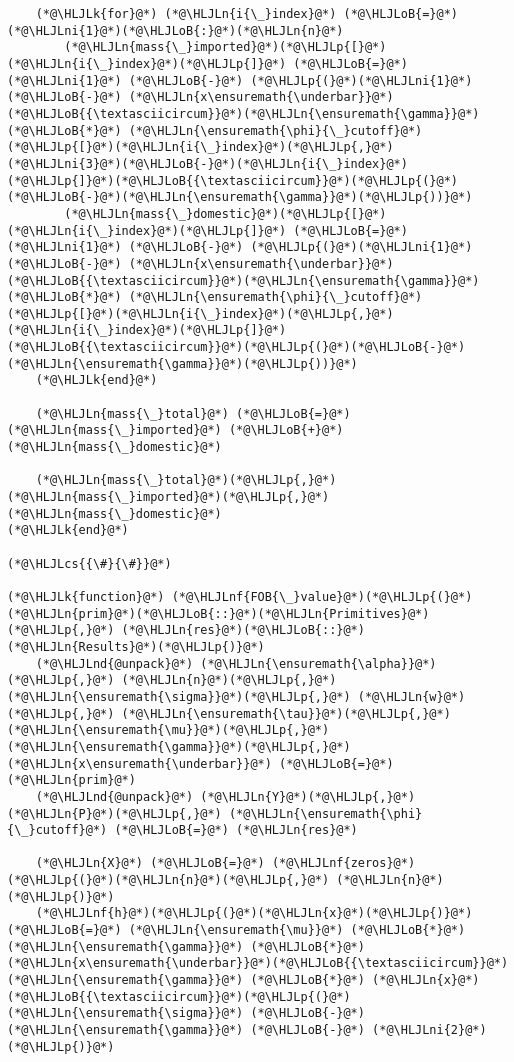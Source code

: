 \documentclass[12pt,a4paper]{article}
\newcommand{\HLJLk}[1]{\textcolor[RGB]{148,91,176}{\textbf{#1}}}
\newcommand{\HLJLn}[1]{#1}
\newcommand{\HLJLnd}[1]{\textcolor[RGB]{214,102,97}{#1}}
\newcommand{\HLJLnf}[1]{\textcolor[RGB]{66,102,213}{#1}}
\newcommand{\HLJLni}[1]{\textcolor[RGB]{59,151,46}{#1}}
\newcommand{\HLJLoB}[1]{\textcolor[RGB]{102,102,102}{\textbf{#1}}}
\newcommand{\HLJLp}[1]{#1}
\newcommand{\HLJLcs}[1]{\textcolor[RGB]{153,153,119}{\textit{#1}}}
\begin{document}
\begin{lstlisting}
    (*@\HLJLk{for}@*) (*@\HLJLn{i{\_}index}@*) (*@\HLJLoB{=}@*) (*@\HLJLni{1}@*)(*@\HLJLoB{:}@*)(*@\HLJLn{n}@*)
        (*@\HLJLn{mass{\_}imported}@*)(*@\HLJLp{[}@*)(*@\HLJLn{i{\_}index}@*)(*@\HLJLp{]}@*) (*@\HLJLoB{=}@*) (*@\HLJLni{1}@*) (*@\HLJLoB{-}@*) (*@\HLJLp{(}@*)(*@\HLJLni{1}@*) (*@\HLJLoB{-}@*) (*@\HLJLn{x\ensuremath{\underbar}}@*)(*@\HLJLoB{{\textasciicircum}}@*)(*@\HLJLn{\ensuremath{\gamma}}@*) (*@\HLJLoB{*}@*) (*@\HLJLn{\ensuremath{\phi}{\_}cutoff}@*)(*@\HLJLp{[}@*)(*@\HLJLn{i{\_}index}@*)(*@\HLJLp{,}@*) (*@\HLJLni{3}@*)(*@\HLJLoB{-}@*)(*@\HLJLn{i{\_}index}@*)(*@\HLJLp{]}@*)(*@\HLJLoB{{\textasciicircum}}@*)(*@\HLJLp{(}@*)(*@\HLJLoB{-}@*)(*@\HLJLn{\ensuremath{\gamma}}@*)(*@\HLJLp{))}@*)
        (*@\HLJLn{mass{\_}domestic}@*)(*@\HLJLp{[}@*)(*@\HLJLn{i{\_}index}@*)(*@\HLJLp{]}@*) (*@\HLJLoB{=}@*) (*@\HLJLni{1}@*) (*@\HLJLoB{-}@*) (*@\HLJLp{(}@*)(*@\HLJLni{1}@*) (*@\HLJLoB{-}@*) (*@\HLJLn{x\ensuremath{\underbar}}@*)(*@\HLJLoB{{\textasciicircum}}@*)(*@\HLJLn{\ensuremath{\gamma}}@*) (*@\HLJLoB{*}@*) (*@\HLJLn{\ensuremath{\phi}{\_}cutoff}@*)(*@\HLJLp{[}@*)(*@\HLJLn{i{\_}index}@*)(*@\HLJLp{,}@*) (*@\HLJLn{i{\_}index}@*)(*@\HLJLp{]}@*)(*@\HLJLoB{{\textasciicircum}}@*)(*@\HLJLp{(}@*)(*@\HLJLoB{-}@*)(*@\HLJLn{\ensuremath{\gamma}}@*)(*@\HLJLp{))}@*)
    (*@\HLJLk{end}@*)

    (*@\HLJLn{mass{\_}total}@*) (*@\HLJLoB{=}@*) (*@\HLJLn{mass{\_}imported}@*) (*@\HLJLoB{+}@*) (*@\HLJLn{mass{\_}domestic}@*)

    (*@\HLJLn{mass{\_}total}@*)(*@\HLJLp{,}@*) (*@\HLJLn{mass{\_}imported}@*)(*@\HLJLp{,}@*) (*@\HLJLn{mass{\_}domestic}@*)
(*@\HLJLk{end}@*)

(*@\HLJLcs{{\#}{\#}}@*)

(*@\HLJLk{function}@*) (*@\HLJLnf{FOB{\_}value}@*)(*@\HLJLp{(}@*)(*@\HLJLn{prim}@*)(*@\HLJLoB{::}@*)(*@\HLJLn{Primitives}@*)(*@\HLJLp{,}@*) (*@\HLJLn{res}@*)(*@\HLJLoB{::}@*)(*@\HLJLn{Results}@*)(*@\HLJLp{)}@*)
    (*@\HLJLnd{@unpack}@*) (*@\HLJLn{\ensuremath{\alpha}}@*)(*@\HLJLp{,}@*) (*@\HLJLn{n}@*)(*@\HLJLp{,}@*) (*@\HLJLn{\ensuremath{\sigma}}@*)(*@\HLJLp{,}@*) (*@\HLJLn{w}@*)(*@\HLJLp{,}@*) (*@\HLJLn{\ensuremath{\tau}}@*)(*@\HLJLp{,}@*) (*@\HLJLn{\ensuremath{\mu}}@*)(*@\HLJLp{,}@*) (*@\HLJLn{\ensuremath{\gamma}}@*)(*@\HLJLp{,}@*) (*@\HLJLn{x\ensuremath{\underbar}}@*) (*@\HLJLoB{=}@*) (*@\HLJLn{prim}@*)
    (*@\HLJLnd{@unpack}@*) (*@\HLJLn{Y}@*)(*@\HLJLp{,}@*) (*@\HLJLn{P}@*)(*@\HLJLp{,}@*) (*@\HLJLn{\ensuremath{\phi}{\_}cutoff}@*) (*@\HLJLoB{=}@*) (*@\HLJLn{res}@*)

    (*@\HLJLn{X}@*) (*@\HLJLoB{=}@*) (*@\HLJLnf{zeros}@*)(*@\HLJLp{(}@*)(*@\HLJLn{n}@*)(*@\HLJLp{,}@*) (*@\HLJLn{n}@*)(*@\HLJLp{)}@*)
    (*@\HLJLnf{h}@*)(*@\HLJLp{(}@*)(*@\HLJLn{x}@*)(*@\HLJLp{)}@*) (*@\HLJLoB{=}@*) (*@\HLJLn{\ensuremath{\mu}}@*) (*@\HLJLoB{*}@*) (*@\HLJLn{\ensuremath{\gamma}}@*) (*@\HLJLoB{*}@*) (*@\HLJLn{x\ensuremath{\underbar}}@*)(*@\HLJLoB{{\textasciicircum}}@*)(*@\HLJLn{\ensuremath{\gamma}}@*) (*@\HLJLoB{*}@*) (*@\HLJLn{x}@*)(*@\HLJLoB{{\textasciicircum}}@*)(*@\HLJLp{(}@*)(*@\HLJLn{\ensuremath{\sigma}}@*) (*@\HLJLoB{-}@*) (*@\HLJLn{\ensuremath{\gamma}}@*) (*@\HLJLoB{-}@*) (*@\HLJLni{2}@*)(*@\HLJLp{)}@*)


\end{lstlisting}
\end{document}
